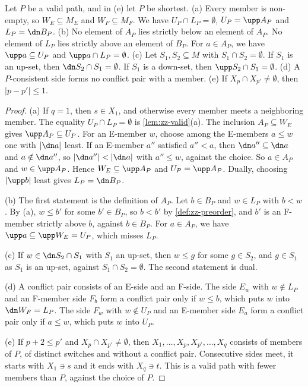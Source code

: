 \begin{lemma}
\label{lem:pa-basic}
Let $P$ be a valid path, and in (e) let $P$ be shortest.
(a) Every member is non-empty, so $W_E \subseteq M_E$ and $W_F \subseteq M_F$.
We have $U_P \cap L_P = \emptyset$, $U_P = \upp A_P$ and $L_P = \dn B_P$.
(b) No element of $A_P$ lies strictly below an element of $A_P$.
No element of $L_P$ lies strictly above an element of $B_P$.
For $a \in A_P$, we have $\upp a \subseteq U_P$ and $\upp a \cap L_P = \emptyset$.
(c) Let $S_1, S_2 \subseteq M$ with $S_1 \cap S_2 = \emptyset$.
If $S_1$ is an up-set, then $\dn S_2 \cap S_1 = \emptyset$.
If $S_1$ is a down-set, then $\upp S_2 \cap S_1 = \emptyset$.
(d) A $P$-consistent side forms no conflict pair with a member.
(e) If $X_p \cap X_{p'} \neq \emptyset$, then $|p - p'| \leq 1$.
\end{lemma}

\begin{proof}
(a) If $q = 1$, then $s \in X_1$, and otherwise every member meets a neighboring member.
The equality $U_P \cap L_P = \emptyset$ is \cref{lem:zz-valid}(a).
The inclusion $A_P \subseteq W_E$ gives $\upp A_P \subseteq U_P$.
For an E-member $w$, choose among the E-members $a \leq w$ one with $|\dn a|$ least.
If an E-member $a''$ satisfied $a'' < a$, then $\dn a'' \subseteq \dn a$ and $a \notin \dn a''$, so $|\dn a''| < |\dn a|$ with $a'' \leq w$, against the choice.
So $a \in A_P$ and $w \in \upp A_P$.
Hence $W_E \subseteq \upp A_P$ and $U_P = \upp A_P$.
Dually, choosing $|\upp b|$ least gives $L_P = \dn B_P$.

(b) The first statement is the definition of $A_P$.
Let $b \in B_P$ and $w \in L_P$ with $b < w$.
By (a), $w \leq b'$ for some $b' \in B_P$, so $b < b'$ by \cref{def:zz-preorder}, and $b'$ is an F-member strictly above $b$, against $b \in B_P$.
For $a \in A_P$, we have $\upp a \subseteq \upp W_E = U_P$, which misses $L_P$.

(c) If $w \in \dn S_2 \cap S_1$ with $S_1$ an up-set, then $w \leq g$ for some $g \in S_2$, and $g \in S_1$ as $S_1$ is an up-set, against $S_1 \cap S_2 = \emptyset$.
The second statement is dual.

(d) A conflict pair consists of an E-side and an F-side.
The side $E_w$ with $w \notin L_P$ and an F-member side $F_b$ form a conflict pair only if $w \leq b$, which puts $w$ into $\dn W_F = L_P$.
The side $F_w$ with $w \notin U_P$ and an E-member side $E_a$ form a conflict pair only if $a \leq w$, which puts $w$ into $U_P$.

(e) If $p + 2 \leq p'$ and $X_p \cap X_{p'} \neq \emptyset$, then $X_1, \dots, X_p, X_{p'}, \dots, X_q$ consists of members of $P$, of distinct switches and without a conflict pair.
Consecutive sides meet, it starts with $X_1 \ni s$ and it ends with $X_q \ni t$.
This is a valid path with fewer members than $P$, against the choice of $P$.
\end{proof}

